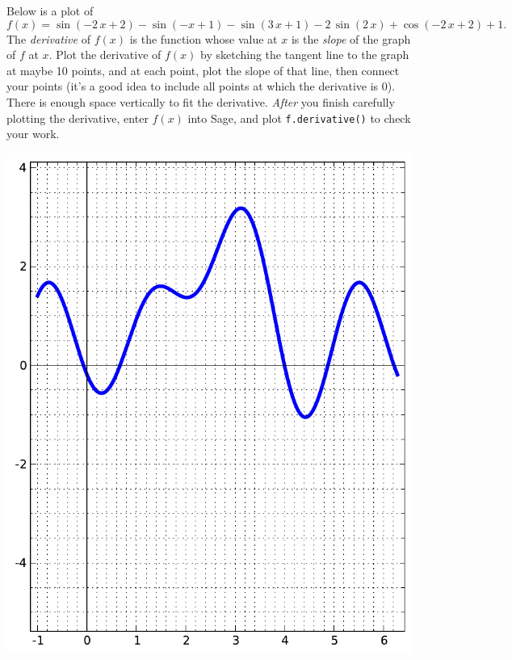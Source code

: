 Below is a plot of $$f(x)=\sin\left(-2 \, x + 2\right) - \sin\left(-x + 1\right) - \sin\left(3 \, x + 1\right) - 2 \, \sin\left(2 \, x\right) + \cos\left(-2 \, x + 2\right) + 1.$$  The {\em \color{red}derivative} of $f(x)$ is the function whose value at $x$ is the {\em slope} of the graph of $f$ at $x$.  Plot the derivative of $f(x)$ by sketching the tangent line to the graph at maybe 10 points, and at each point, plot the slope of that line, then connect your points (it's a good idea to include all points at which the derivative is 0).  There is enough space vertically to fit the derivative.  {\em After} you finish carefully plotting the derivative, enter $f(x)$ into Sage, and plot {\color{blue}\verb|f.derivative()|} to check your work.
\begin{center}\includegraphics{functions/63.pdf}\end{center}\newpage

